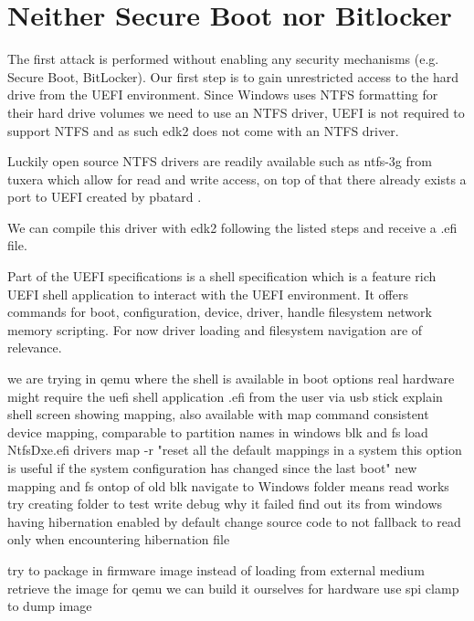 
\section{Neither Secure Boot nor Bitlocker}
The first attack is performed without enabling any security mechanisms (e.g. Secure Boot, BitLocker). Our first step is to gain unrestricted access to the hard drive from the UEFI environment.
Since Windows uses NTFS formatting for their hard drive volumes we need to use an NTFS driver, UEFI is not required to support NTFS and as such edk2 does not come with an NTFS driver.

Luckily open source NTFS drivers are readily available such as ntfs-3g from tuxera \cite{ntfs-3g} which allow for read and write access, on top of that there already exists a port to UEFI created by pbatard \cite{ntfs-3g-uefi}.

We can compile this driver with edk2 following the listed steps and receive a .efi file.

Part of the UEFI specifications is a shell specification which is a feature rich UEFI shell application to interact with the UEFI environment.
It offers commands for
boot,
configuration,
device, driver, handle
filesystem
network
memory
scripting.
For now driver loading and filesystem navigation are of relevance.



we are trying in qemu where the shell is available in boot options
real hardware might require the uefi shell application .efi from the user via usb stick
explain shell screen
showing mapping, also available with map command
consistent device mapping, comparable to partition names in windows
\cite{uefi-shell}
blk and fs
load NtfsDxe.efi
drivers
map -r "reset all the default mappings in a system this option is useful if the system configuration has changed since the last boot"
new mapping and fs ontop of old blk
navigate to Windows folder
means read works
try creating folder to test write
debug why it failed
find out its from windows having hibernation enabled by default
change source code to not fallback to read only when encountering hibernation file

try to package in firmware image instead of loading from external medium
retrieve the image
for qemu we can build it ourselves
for hardware use spi clamp to  dump image


